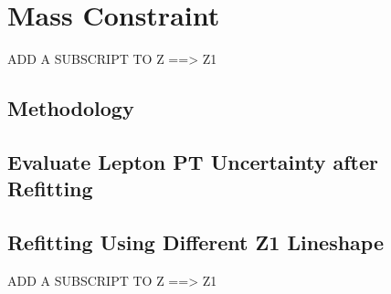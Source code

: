 \section{\PZ Mass Constraint}

ADD A SUBSCRIPT TO Z ==> Z1

\subsection{Methodology}

\subsection{Evaluate Lepton PT Uncertainty after Refitting}

\subsection{Refitting Using Different Z1 Lineshape}

ADD A SUBSCRIPT TO Z ==> Z1